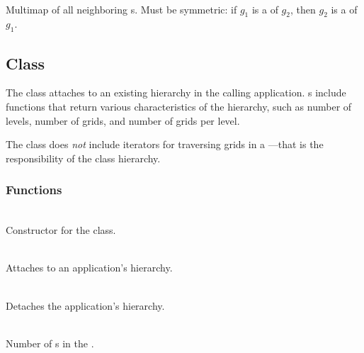 \documentclass[11pt]{article}
\begin{document}
     \\
    Multimap of all neighboring s.  Must be symmetric: if
     $g_1$ is a  of $g_2$, then $g_2$ is a
     of $g_1$.

\subsection{ Class} \label{s:hierarchy}

   The  class attaches to an existing hierarchy in
   the calling application.  s include functions that
   return various characteristics of the hierarchy, such as number of
   levels, number of grids, and number of grids per level.

   The  class does \textit{not} include iterators for
   traversing grids in a ---that is the responsibility
   of the  class hierarchy.

   \umlHierarchy

\subsubsection{ Functions}



     \\
    Constructor for the  class.

     \\
    Attaches to an application's hierarchy.

     \\
    Detaches the application's hierarchy.

     \\
    Number of s in the .
\end{document}
